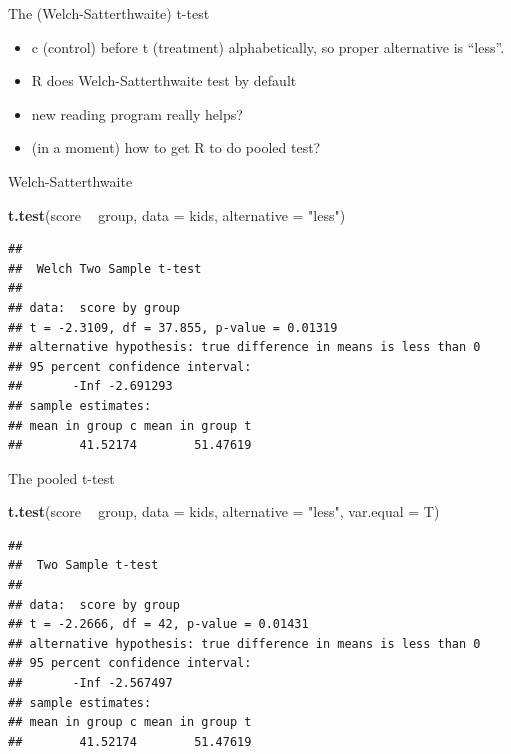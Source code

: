 \documentclass[
  ignorenonframetext,
]{beamer}
\newenvironment{Shaded}{\begin{snugshade}}{\end{snugshade}}
\newcommand{\DataTypeTok}[1]{\textcolor[rgb]{0.13,0.29,0.53}{#1}}
\newcommand{\KeywordTok}[1]{\textcolor[rgb]{0.13,0.29,0.53}{\textbf{#1}}}
\newcommand{\NormalTok}[1]{#1}
\newcommand{\OperatorTok}[1]{\textcolor[rgb]{0.81,0.36,0.00}{\textbf{#1}}}
\newcommand{\StringTok}[1]{\textcolor[rgb]{0.31,0.60,0.02}{#1}}
\providecommand{\tightlist}{%
  \setlength{\itemsep}{0pt}\setlength{\parskip}{0pt}}
\begin{document}
\begin{frame}{The (Welch-Satterthwaite) t-test}
\protect\hypertarget{the-welch-satterthwaite-t-test}{}

\begin{itemize}
\tightlist
\item
  c (control) before t (treatment) alphabetically, so proper alternative
  is ``less''.
\item
  R does Welch-Satterthwaite test by default
\item
  new reading program really helps?
\item
  (in a moment) how to get R to do pooled test?
\end{itemize}

\end{frame}

\begin{frame}[fragile]{Welch-Satterthwaite}
\protect\hypertarget{welch-satterthwaite}{}

\begin{Shaded}
\begin{Highlighting}[]
\KeywordTok{t.test}\NormalTok{(score }\OperatorTok{~}\StringTok{ }\NormalTok{group, }\DataTypeTok{data =}\NormalTok{ kids, }\DataTypeTok{alternative =} \StringTok{"less"}\NormalTok{)}
\end{Highlighting}
\end{Shaded}

\begin{verbatim}
## 
##  Welch Two Sample t-test
## 
## data:  score by group
## t = -2.3109, df = 37.855, p-value = 0.01319
## alternative hypothesis: true difference in means is less than 0
## 95 percent confidence interval:
##       -Inf -2.691293
## sample estimates:
## mean in group c mean in group t 
##        41.52174        51.47619
\end{verbatim}

\end{frame}

\begin{frame}[fragile]{The pooled t-test}
\protect\hypertarget{the-pooled-t-test}{}

\begin{Shaded}
\begin{Highlighting}[]
\KeywordTok{t.test}\NormalTok{(score }\OperatorTok{~}\StringTok{ }\NormalTok{group, }\DataTypeTok{data =}\NormalTok{ kids, }
       \DataTypeTok{alternative =} \StringTok{"less"}\NormalTok{, }\DataTypeTok{var.equal =}\NormalTok{ T)}
\end{Highlighting}
\end{Shaded}

\begin{verbatim}
## 
##  Two Sample t-test
## 
## data:  score by group
## t = -2.2666, df = 42, p-value = 0.01431
## alternative hypothesis: true difference in means is less than 0
## 95 percent confidence interval:
##       -Inf -2.567497
## sample estimates:
## mean in group c mean in group t 
##        41.52174        51.47619
\end{verbatim}

\end{frame}
\end{document}
